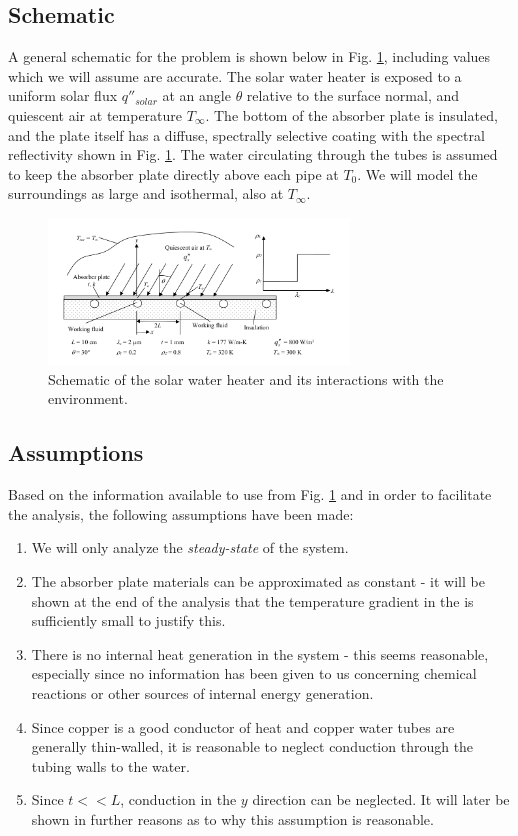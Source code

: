 \documentclass[]{article}
\begin{document}
\subsection{Schematic}

A general schematic for the problem is shown below in Fig. \ref{fig:base_schematic}, including values which we will assume are accurate. The solar water heater is exposed to a uniform solar flux $q''_{solar}$ at an angle $\theta$ relative to the surface normal, and quiescent air at temperature $T_{\infty}$. The bottom of the absorber plate is insulated, and the plate itself has a diffuse, spectrally selective coating with the spectral reflectivity shown in Fig. \ref{fig:base_schematic}. The water circulating through the tubes is assumed to keep the absorber plate directly above each pipe at $T_0$. We will model the surroundings as large and isothermal, also at $T_{\infty}$.

\begin{figure}[h]
	\centering
	\includegraphics[width=8cm]{schematic1.png}
	\caption{Schematic of the solar water heater and its interactions with the environment.}
	\label{fig:base_schematic}
\end{figure}

\subsection{Assumptions}

Based on the information available to use from Fig. \ref{fig:base_schematic} and in order to facilitate the analysis, the following assumptions have been made:

\begin{enumerate}
	\item We will only analyze the \textit{steady-state} of the system.
	\item \label{ass:constant}The absorber plate materials can be approximated as constant - it will be shown at the end of the analysis that the temperature gradient in the is sufficiently small to justify this.
	\item There is no internal heat generation in the system - this seems reasonable, especially since no information has been given to us concerning chemical reactions or other sources of internal energy generation.
	\item Since copper is a good conductor of heat and copper water tubes are generally thin-walled, it is reasonable to neglect conduction through the tubing walls to the water.
	\item Since $t << L$, conduction in the $y$ direction can be neglected. It will later be shown in \pageref{eq:biot} further reasons as to why this assumption is reasonable.
\end{enumerate}
\end{document}
